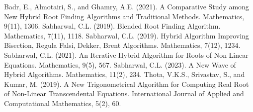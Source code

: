 \documentclass[amsmath, amssymb, aps]{revtex4-2}
\begin{document}
\begin{thebibliography}{99}
 Badr, E., Almotairi, S., and Ghamry, A.E. (2021). A Comparative Study among New Hybrid Root Finding Algorithms and Traditional Methods. Mathematics, 9(11), 1306.
 Sabharwal, C.L. (2019). Blended Root Finding Algorithm. Mathematics, 7(11), 1118.
 Sabharwal, C.L. (2019). Hybrid Algorithm Improving Bisection, Regula Falsi, Dekker, Brent Algorithms. Mathematics, 7(12), 1234.
 Sabharwal, C.L. (2021). An Iterative Hybrid Algorithm for Roots of Non-Linear Equations. Mathematics, 9(5), 567.
 Sabharwal, C.L. (2023). A New Wave of Hybrid Algorithms. Mathematics, 11(2), 234.
 Thota, V.K.S., Srivastav, S., and Kumar, M. (2019). A New Trigonometrical Algorithm for Computing Real Root of Non-Linear Transcendental Equations. International Journal of Applied and Computational Mathematics, 5(2), 60.

\end{thebibliography}
\end{document}
